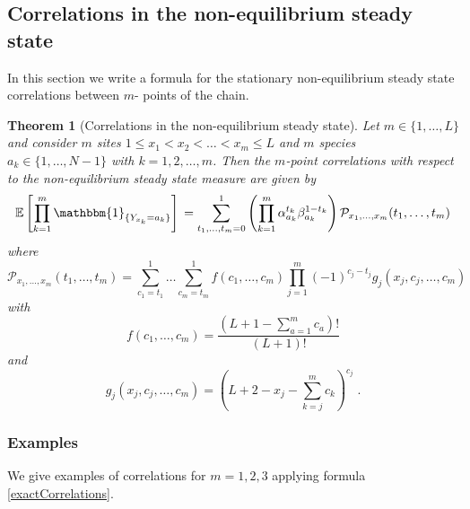 \documentclass[10pt]{article}
\numberwithin{equation}{section}
\numberwithin{equation}{subsection}
\newtheorem{theorem}{Theorem}
\newcommand{\dt}{\;.}
\begin{document}
\subsection{Correlations in the non-equilibrium steady state}\label{subsection-exact}
In this section we write a formula for the stationary non-equilibrium steady state correlations between $m$- points of the chain.
\begin{theorem}[Correlations in the non-equilibrium steady state]\label{thm-correlations}
Let $m\in \{1,\ldots,L\}$ and consider $m$ sites $1 \le x_{1} < x_2 < \ldots < x_m \le L $ and
$m$ species $a_{k}\in\{1,\ldots,N-1\}$  with $k=1,2,\ldots, m$. Then the $m$-point correlations with respect to the non-equilibrium steady state measure are given by 
\begin{equation}\label{exactCorrelations}
\mathbb{E}\left[\prod_{k=1}^{m}\mathbbm{1}_{\{Y_{x_{k}}=a_{k}\}}\right]\\=\sum_{t_{1},\ldots,t_{m}=0}^{1}\left(\prod_{k=1}^{m}\alpha_{a_{k}}^{t_{k}}\beta_{a_{k}}^{1-t_{k}}\right)\mathcal{P}_{x_{1},\ldots,x_{m}}(t_{1},\ldots,t_{m})
\end{equation}
where
\begin{equation}\label{abs-probabilities}
	\mathcal{P}_{x_{1},\ldots,x_{m}}(t_{1},\ldots,t_{m})=\sum_{c_{1}=t_{1}}^{1}\ldots\sum_{c_{m}=t_{m}}^{1}f(c_{1},\ldots,c_{m})\prod_{j=1}^{m}(-1)^{c_{j}-t_{j}}g_{j}(x_{j},c_{j},\ldots,c_{m})
\end{equation}
with
\begin{equation}\label{powerCoeffNOspec}
	f(c_{1},\ldots,c_{m})=\frac{(L+1-\sum_{a=1}^{m}c_{a})!}{(L+1)!}
\end{equation}
and
\begin{equation}\label{powerCoeffSpecies}
	g_{j}(x_{j},c_{j},\ldots,c_{m})=\left(L+2-x_{j}-\sum_{k=j}^{m}c_{k}\right)^{c_{j}}\dt
\end{equation}
\end{theorem}

\subsubsection{Examples}
We give examples  of correlations for $m=1,2,3$ applying formula \eqref{exactCorrelations}.
\end{document}
